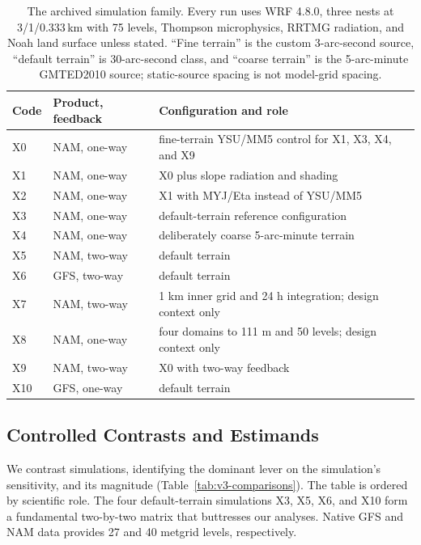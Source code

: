 \documentclass[air,article,submit,moreauthors]{Definitions/mdpi}
\begin{document}
\begin{table}[H]
\caption{The archived simulation family.
Every run uses WRF 4.8.0, three nests at 3/1/0.333\,km with 75 levels, Thompson microphysics, RRTMG radiation, and Noah land surface unless stated.
``Fine terrain'' is the custom 3-arc-second source, ``default terrain'' is 30-arc-second class, and ``coarse terrain'' is the 5-arc-minute GMTED2010 source; static-source spacing is not model-grid spacing.}
\label{tab:v3-family}
\centering
\small
\begin{tabularx}{\textwidth}{llL}
\toprule
Code & Product, feedback & Configuration and role \\
\midrule
X0  & NAM, one-way & fine-terrain YSU/MM5 control for X1, X3, X4, and X9 \\
X1  & NAM, one-way & X0 plus slope radiation and shading \\
X2  & NAM, one-way & X1 with MYJ/Eta instead of YSU/MM5 \\
X3  & NAM, one-way & default-terrain reference configuration \\
X4  & NAM, one-way & deliberately coarse 5-arc-minute terrain \\
X5  & NAM, two-way & default terrain \\
X6  & GFS, two-way & default terrain \\
X7  & NAM, two-way & 1 km inner grid and 24 h integration; design context only \\
X8  & NAM, one-way & four domains to 111 m and 50 levels; design context only \\
X9  & NAM, two-way & X0 with two-way feedback \\
X10 & GFS, one-way & default terrain \\
\bottomrule
\end{tabularx}
\end{table}

\subsection{Controlled Contrasts and Estimands}
\label{sec:v3-contrasts}

We contrast simulations, identifying the dominant lever on the simulation's sensitivity, and its magnitude (Table~\ref{tab:v3-comparisons}).  The table is ordered by scientific role.
The four default-terrain simulations X3, X5, X6, and X10 form a fundamental two-by-two matrix that buttresses our analyses.
Native GFS and NAM data provides 27 and 40 metgrid levels, respectively.
\end{document}
